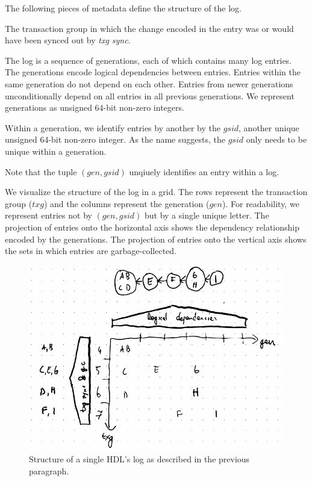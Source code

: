 \documentclass[12pt,a4paper,twoside]{book}
\begin{document}
The following pieces of metadata define the structure of the log.
\begin{description}[noitemsep,leftmargin=1.5cm,labelindent=1cm]
    \item[Transaction Group (txg)] The transaction group in which the change encoded in the entry was or would have been synced out by \textit{txg sync}.
    \item[Generation Number (gen)] The log is a sequence of generations, each of which contains many log entries.
        The generations encode logical dependencies between entries.
        Entries within the same generation do not depend on each other.
        Entries from newer generations unconditionally depend on all entries in all previous generations.
        We represent generations as unsigned 64-bit non-zero integers.
    \item[Generation-Scoped ID (gsid)] Within a generation, we identify entries by another by the $gsid$, another unique unsigned 64-bit non-zero integer.
        As the name suggests, the $gsid$ only needs to be unique within a generation.
\end{description}
Note that the tuple $(gen, gsid)$ unqiuely identifies an entry within a log.

We visualize the structure of the log in a grid.
The rows represent the transaction group ($txg$) and the columns represent the generation ($gen$).
For readability, we represent entries not by $(gen, gsid)$ but by a single unique letter.
The projection of entries onto the horizontal axis shows the dependency relationship encoded by the generations.
The projection of entries onto the vertical axis shows the sets in which entries are garbage-collected.

\begin{figure}[H]
    \includegraphics{fig/prb_hdl_log_structure_example}
    \caption{Structure of a single HDL's log as described in the previous paragraph.}
    \label{fig:prb_hdl_log_structure_example}
\end{figure}
\end{document}
